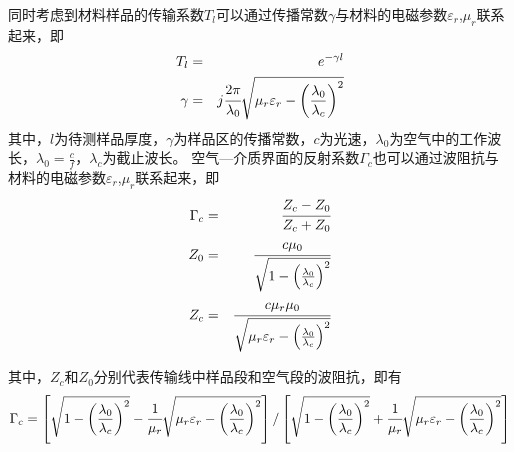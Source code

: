 \documentclass[a4paper]{article}
\begin{document}
同时考虑到材料样品的传输系数$T_l$可以通过传播常数$\gamma$与材料的电磁参数$\varepsilon_r$,$\mu_r$联系起来，即
\begin{eqnarray}
T_l &=& e^{-\gamma l}\\
\gamma &=& j\cfrac{2\pi}{\lambda_0}\sqrt{\mu_r\varepsilon_r-\left(\frac{\lambda_0}{\lambda_c}\right)^2}
\end{eqnarray}
其中，$l$为待测样品厚度，$\gamma$为样品区的传播常数，$c$为光速，$\lambda_0$为空气中的工作波长，$\lambda_0 = \frac{c}{f}$，$\lambda_c$为截止波长。
空气—介质界面的反射系数$\Gamma_c$也可以通过波阻抗与材料的电磁参数$\varepsilon_r$,$\mu_r$联系起来，即
\begin{eqnarray}
\Gamma_c &=& \cfrac{Z_c-Z_0}{Z_c+Z_0}\\
Z_0 &=& \cfrac{c\mu_0}{\sqrt{1-\left(\frac{\lambda_0}{\lambda_c}\right)^2}}\\
Z_c &=& \cfrac{c\mu_r\mu_0}{\sqrt{\mu_r\varepsilon_r-\left(\frac{\lambda_0}{\lambda_c}\right)^2}}
\end{eqnarray}

其中，$Z_c$和$Z_0$分别代表传输线中样品段和空气段的波阻抗，即有
\begin{equation}
\Gamma_c = \left[\sqrt{1-\left(\frac{\lambda_0}{\lambda_c}\right)^2} - \cfrac{1}{\mu_r}\sqrt{\mu_r\varepsilon_r-\left(\frac{\lambda_0}{\lambda_c}\right)^2}\right]/\left[\sqrt{1-\left(\frac{\lambda_0}{\lambda_c}\right)^2} + \cfrac{1}{\mu_r}\sqrt{\mu_r\varepsilon_r-\left(\frac{\lambda_0}{\lambda_c}\right)^2}\right]
\end{equation}
\end{document}
